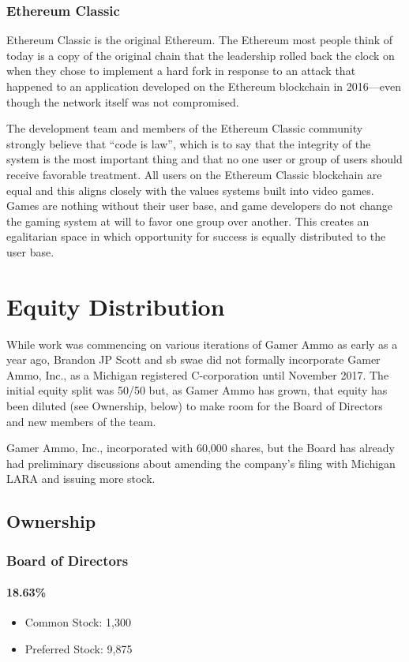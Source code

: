 \documentclass[11pt]{report}
\begin{document}
\subsection{Ethereum Classic}
Ethereum Classic is the original Ethereum. The Ethereum most people think of today is a copy of the original chain that the leadership rolled back the clock on when they chose to implement a hard fork in response to an attack that happened to an application developed on the Ethereum blockchain in 2016---even though the  network itself was not compromised.

The development team and members of the Ethereum Classic community strongly believe that ``code is law''\cite{code-is-law}, which is to say that the integrity of the system is the most important thing and that no one user or group of users should receive favorable treatment. All users on the Ethereum Classic blockchain are equal and this aligns closely with the values systems built into video games. Games are nothing without their user base, and game developers do not change the gaming system at will to favor one group over another. This creates an egalitarian space in which opportunity for success is equally distributed to the user base. 

\chapter{Equity Distribution}

While work was commencing on various iterations of Gamer Ammo as early as a year ago, Brandon JP Scott and sb swae did not formally incorporate Gamer Ammo, Inc., as a Michigan registered C-corporation until November 2017. The initial equity split was 50/50 but, as Gamer Ammo has grown, that equity has been diluted (see Ownership, below) to make room for the Board of Directors and new members of the team.

Gamer Ammo, Inc., incorporated with 60,000 shares, but the Board has already had preliminary discussions about amending the company's filing with Michigan LARA and issuing more stock.

\section{Ownership}
\subsection{Board of Directors}
\subsubsection{\textbf{18.63\%}}
\begin{itemize}
\item Common Stock: 1,300
\item Preferred Stock: 9,875
\end{itemize}
\end{document}

